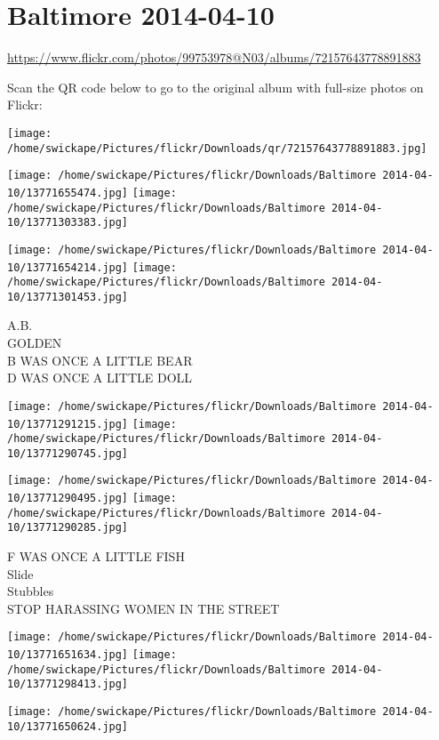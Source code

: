 \documentclass[10pt,letterpaper]{article}
\title{}
\author{}
\date{}
\begin{document}
\section*{Baltimore 2014-04-10}

\url{https://www.flickr.com/photos/99753978@N03/albums/72157643778891883}

Scan the QR code below to go to the original album with full-size photos on Flickr:

\texttt{[image: /home/swickape/Pictures/flickr/Downloads/qr/72157643778891883.jpg]}
\pagebreak

\texttt{[image: /home/swickape/Pictures/flickr/Downloads/Baltimore 2014-04-10/13771655474.jpg]}
\texttt{[image: /home/swickape/Pictures/flickr/Downloads/Baltimore 2014-04-10/13771303383.jpg]}

\texttt{[image: /home/swickape/Pictures/flickr/Downloads/Baltimore 2014-04-10/13771654214.jpg]}
\texttt{[image: /home/swickape/Pictures/flickr/Downloads/Baltimore 2014-04-10/13771301453.jpg]}

A.B.\\
GOLDEN\\
B WAS ONCE A LITTLE BEAR\\
D WAS ONCE A LITTLE DOLL
\pagebreak

\texttt{[image: /home/swickape/Pictures/flickr/Downloads/Baltimore 2014-04-10/13771291215.jpg]}
\texttt{[image: /home/swickape/Pictures/flickr/Downloads/Baltimore 2014-04-10/13771290745.jpg]}

\texttt{[image: /home/swickape/Pictures/flickr/Downloads/Baltimore 2014-04-10/13771290495.jpg]}
\texttt{[image: /home/swickape/Pictures/flickr/Downloads/Baltimore 2014-04-10/13771290285.jpg]}

F WAS ONCE A LITTLE FISH\\
Slide\\
Stubbles\\
STOP HARASSING WOMEN IN THE STREET
\pagebreak

\texttt{[image: /home/swickape/Pictures/flickr/Downloads/Baltimore 2014-04-10/13771651634.jpg]}
\texttt{[image: /home/swickape/Pictures/flickr/Downloads/Baltimore 2014-04-10/13771298413.jpg]}

\vspace{0.25in}
\texttt{[image: /home/swickape/Pictures/flickr/Downloads/Baltimore 2014-04-10/13771650624.jpg]}
\end{document}
